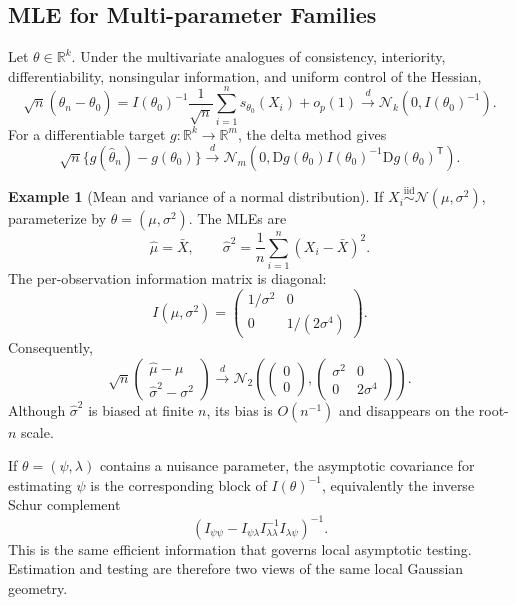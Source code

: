 \documentclass[12pt,oneside]{book}
\numberwithin{equation}{section}
\theoremstyle{definition}
\newtheorem{example}{Example}[section]
\theoremstyle{plain}
\theoremstyle{remark}
\newcommand{\R}{\mathbb{R}}
\newcommand{\iid}{\overset{\text{iid}}{\sim}}
\newcommand{\convd}{\overset{d}{\to}}
\newcommand{\Normal}{\mathcal{N}}
\begin{document}
\subsection{MLE for Multi-parameter Families}

Let $\theta\in\R^k$.  Under the multivariate analogues of consistency,
interiority, differentiability, nonsingular information, and uniform control
of the Hessian,
\begin{equation}
 \sqrt n(\widehat\theta_n-\theta_0)
 =I(\theta_0)^{-1}
   \frac1{\sqrt n}\sum_{i=1}^n s_{\theta_0}(X_i)+o_p(1)
 \convd\Normal_k(0,I(\theta_0)^{-1}).
 \label{eq:multivariate-mle-limit}
\end{equation}
For a differentiable target $g:\R^k\to\R^m$, the delta method gives
\[
 \sqrt n\{g(\widehat\theta_n)-g(\theta_0)\}
 \convd\Normal_m\left(0,
 \mathrm Dg(\theta_0)I(\theta_0)^{-1}
 \mathrm Dg(\theta_0)^\mathsf T\right).
\]

\begin{example}[Mean and variance of a normal distribution]
If $X_i\iid\Normal(\mu,\sigma^2)$, parameterize by
$\theta=(\mu,\sigma^2)$.  The MLEs are
\[
    \widehat\mu=\bar X,
    \qquad
    \widehat\sigma^2=\frac1n\sum_{i=1}^n(X_i-\bar X)^2.
\]
The per-observation information matrix is diagonal:
\[
 I(\mu,\sigma^2)=
 \begin{pmatrix}
  1/\sigma^2&0\\
  0&1/(2\sigma^4)
 \end{pmatrix}.
\]
Consequently,
\[
 \sqrt n
 \begin{pmatrix}
  \widehat\mu-\mu\\
  \widehat\sigma^2-\sigma^2
 \end{pmatrix}
 \convd\Normal_2\left(
 \begin{pmatrix}0\\0\end{pmatrix},
 \begin{pmatrix}
  \sigma^2&0\\
  0&2\sigma^4
 \end{pmatrix}\right).
\]
Although $\widehat\sigma^2$ is biased at finite $n$, its bias is $O(n^{-1})$
and disappears on the root-$n$ scale.
\end{example}

If $\theta=(\psi,\lambda)$ contains a nuisance parameter, the asymptotic
covariance for estimating $\psi$ is the corresponding block of
$I(\theta)^{-1}$, equivalently the inverse Schur complement
\[
 \left(I_{\psi\psi}
 -I_{\psi\lambda}I_{\lambda\lambda}^{-1}
  I_{\lambda\psi}\right)^{-1}.
\]
This is the same efficient information that governs local asymptotic testing.
Estimation and testing are therefore two views of the same local Gaussian
geometry.
\end{document}
